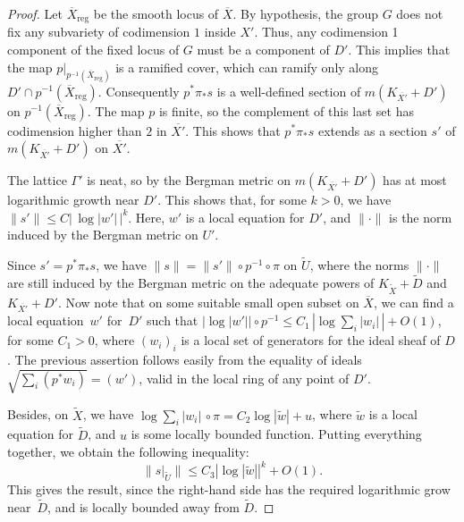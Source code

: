 \documentclass[JEP,XML,SOM,Unicode]{cedram}
\theoremstyle{plain}
\theoremstyle{definition}
\numberwithin{equation}{theorem}
\newcommand{\abs}[1]{ {\left| #1 \right| } }
\newcommand{\norm}[1] { \| #1 \| }
\begin{document}
\begin{proof}

Let $\overline{X}_{\mathrm{reg}}$ be the smooth locus of $\overline{X}$. By hypothesis, the group $G$ does not fix any subvariety of codimension $1$ inside $X'$. Thus, any codimension 1 component of the fixed locus of $G$ must be a component of $D'$. This implies that the map $p|_{p^{-1} (\overline{X}_{\mathrm{reg}})}$ is a ramified cover, which can ramify only along $D'\cap p^{-1}(\overline{X}_{\mathrm{reg}})$. Consequently $p^\ast \pi_\ast s$ is a well-defined section of $m( K_{\overline{X'}} + D')$ on $p^{-1}(\overline{X}_{\mathrm{reg}})$. The map $p$ is finite, so the complement of this last set has codimension higher than $2$ in $\overline{X'}$. This shows that $p^\ast \pi_\ast s$ extends as a section $s'$ of $m( K_{\overline{X'}} + D')$ on $\overline{X'}$.

The lattice $\Gamma'$ is neat, so by \cite{Mum77} the Bergman metric on $m(K_{\overline{X'}} + D')$ has at most logarithmic growth near $D'$. This shows that, for some $k > 0$, we have $\norm{s'} \leq C |\, \log |w'| \,| ^k$. Here, $w'$ is a local equation for $D'$, and $\norm{\cdot}$ is the norm induced by the Bergman metric on $U'$.

Since $s' = p^\ast \pi_\ast s$, we have $\norm{s} = \norm{s'} \circ p^{-1} \circ \pi$ on $\widetilde{U}$, where the norms $\norm{\cdot}$ are still induced by the Bergman metric on the adequate powers of $K_{\widetilde{X}} + \widetilde{D}$ and $K_{\overline{X'}} + D'$. Now note that on some suitable small open subset on $\overline{X}$, we can find a local equation~$w'$ for~$D'$ such that $\left| \log |w'| \right| \circ p^{-1} \leq C_1 \, \left| \log \sum_i |w_i| \, \right| + O(1)$, for some $C_1 > 0$, where $(w_i)_i$ is a local set of generators for the ideal sheaf of $D$. The previous assertion follows easily from the equality of ideals $\sqrt{\sum_i \left( p^\ast w_i \right)} = \left( w' \right)$, valid in the local ring of any point of $D'$.

Besides, on $\widetilde{X}$, we have $ \log \sum_i |w_i| \, \circ \pi = C_2 \log |\widetilde{w}| + u$, where $\widetilde{w}$ is a local equation for $\widetilde{D}$, and $u$ is some locally bounded function. Putting everything together, we obtain the following inequality:
$$
\norm{ \left. s \right|_{\widetilde{U}} } \leq C_3 \abs{ \log \abs{\widetilde{w}}}^k + O(1).
$$
This gives the result, since the right-hand side has the required logarithmic grow near~$\widetilde{D}$, and is locally bounded away from $\widetilde{D}$.
\end{proof}
\end{document}
